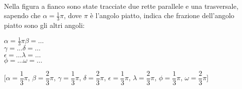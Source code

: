 % 

\begin{esercizio}
\label{ese:}
~

\noindent\begin{minipage}{.33\textwidth}
Nella figura a fianco sono state tracciate due rette parallele e una 
trasversale, sapendo che $\alpha=\frac{1}{3}\pi$, dove $\pi$ è 
l'angolo piatto, indica che frazione dell'angolo piatto sono gli 
altri angoli:
\end{minipage} \hfill
\begin{minipage}{.3\textwidth}
$\alpha=\frac{1}{3}\pi$\tab\tab $\beta = \ldots$\\
$\gamma=\ldots$\tab\tab $\delta = \ldots$\\
$\epsilon=\ldots$\tab\tab $\lambda = \ldots$\\
$\phi=\ldots$\tab\tab $\omega = \ldots$
\end{minipage} \hfill
\begin{minipage}{.3\textwidth}
\begin{inaccessibleblock}
\begin{center}  \end{center}
\end{inaccessibleblock}
\end{minipage}
\tab\hfill [$\alpha=\dfrac{1}{3}\pi$, $\beta=\dfrac{2}{3}\pi$, 
$\gamma=\dfrac{1}{3}\pi$, $\delta=\dfrac{2}{3}\pi$, 
$\epsilon=\dfrac{1}{3}\pi$, $\lambda=\dfrac{2}{3}\pi$, 
$\phi=\dfrac{1}{3}\pi$, $\omega=\dfrac{2}{3}\pi$]
\end{esercizio}

